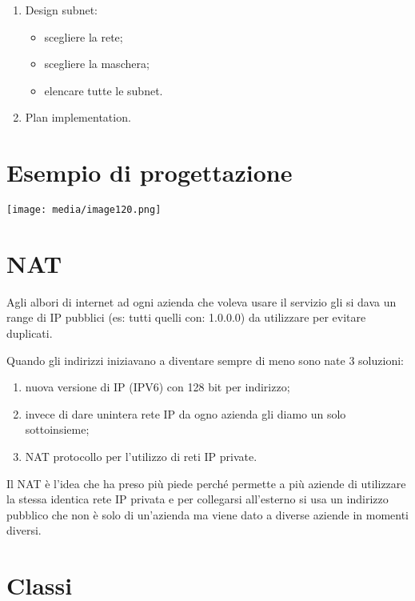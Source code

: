\begin{enumerate}
\def\labelenumi{\arabic{enumi}.}
\setcounter{enumi}{1}
\item
  Design subnet:

  \begin{itemize}
  \item
    scegliere la rete;
  \item
    scegliere la maschera;
  \item
    elencare tutte le subnet.
  \end{itemize}
\item
  Plan implementation.
\end{enumerate}

\section{Esempio di progettazione}\label{esempio-di-progettazione}

\texttt{[image: media/image120.png]}

\section{NAT}\label{nat}

Agli albori di internet ad ogni azienda che voleva usare il servizio gli
si dava un range di IP pubblici (es: tutti quelli con: 1.0.0.0) da
utilizzare per evitare duplicati.

Quando gli indirizzi iniziavano a diventare sempre di meno sono nate 3
soluzioni:

\begin{enumerate}
\def\labelenumi{\arabic{enumi}.}
\item
  nuova versione di IP (IPV6) con 128 bit per indirizzo;
\item
  invece di dare un\textquotesingle intera rete IP da ogno azienda gli
  diamo un solo sottoinsieme;
\item
  NAT protocollo per l'utilizzo di reti IP private.
\end{enumerate}

Il NAT è l'idea che ha preso più piede perché permette a più aziende di
utilizzare la stessa identica rete IP privata e per collegarsi
all'esterno si usa un indirizzo pubblico che non è solo di un'azienda ma
viene dato a diverse aziende in momenti diversi.

\section{Classi}\label{classi}

